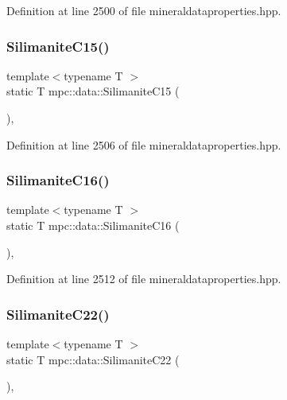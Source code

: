 Definition at line 2500 of file mineraldataproperties.\+hpp.

\mbox{\label{namespacempc_1_1data_aefb27e4cd693bfda6bb35e866110d16c}} 
\subsubsection{\texorpdfstring{Silimanite\+C15()}{SilimaniteC15()}}
{\footnotesize\ttfamily template$<$typename T $>$ \\
static T mpc\+::data\+::\+Silimanite\+C15 (\begin{DoxyParamCaption}{ }\end{DoxyParamCaption})\hspace{0.3cm}{\ttfamily [inline]}, {\ttfamily [static]}}



Definition at line 2506 of file mineraldataproperties.\+hpp.

\mbox{\label{namespacempc_1_1data_a2bba13eae8378d279db40209c529827a}} 
\subsubsection{\texorpdfstring{Silimanite\+C16()}{SilimaniteC16()}}
{\footnotesize\ttfamily template$<$typename T $>$ \\
static T mpc\+::data\+::\+Silimanite\+C16 (\begin{DoxyParamCaption}{ }\end{DoxyParamCaption})\hspace{0.3cm}{\ttfamily [inline]}, {\ttfamily [static]}}



Definition at line 2512 of file mineraldataproperties.\+hpp.

\mbox{\label{namespacempc_1_1data_ae5b18e375f4c7aac93a36ff30bb2e72a}} 
\subsubsection{\texorpdfstring{Silimanite\+C22()}{SilimaniteC22()}}
{\footnotesize\ttfamily template$<$typename T $>$ \\
static T mpc\+::data\+::\+Silimanite\+C22 (\begin{DoxyParamCaption}{ }\end{DoxyParamCaption})\hspace{0.3cm}{\ttfamily [inline]}, {\ttfamily [static]}}



